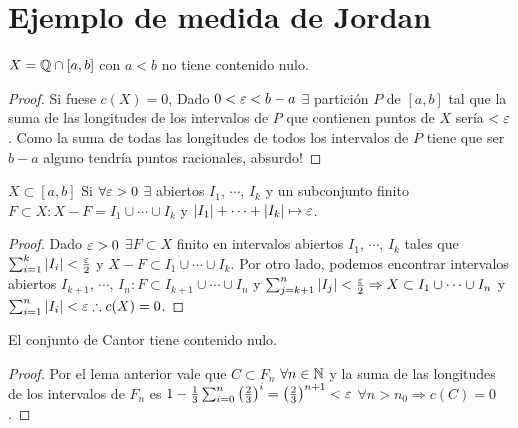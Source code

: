 \section{Ejemplo de medida de Jordan}

\begin{eg}
  \(X = \mathbb{Q} \cap [a, b]\) con \(a < b\) no tiene contenido nulo.
  \begin{proof}
    Si fuese \(c(X) = 0\), Dado \(0 < \varepsilon < b-a\) \(\exists \) partición \(P\) de \([a, b]\) tal que la suma de las longitudes de los intervalos de \(P\) que contienen puntos de \(X\) sería \(< \varepsilon \).
    Como la suma de todas las longitudes de todos los intervalos de \(P\) tiene que ser \(b-a\) alguno tendría puntos racionales, absurdo!
  \end{proof}
\end{eg}

\begin{lemma}
  \(X \subset [a, b]\) Si \(\forall \varepsilon > 0\) \(\exists \) abiertos \(I_1\), \(\cdots \), \(I_k\) y un subconjunto finito \(F \subset X : X - F = I_1 \cup \cdots \cup I_k\) y \(|I_1| + \cdots + |I_k| \mapsto \varepsilon \).
  \begin{proof}
    Dado \(\varepsilon > 0\) \(\exists F \subset X\) finito en intervalos abiertos \(I_1\), \(\cdots \), \(I_k\) tales que \(\sum_{i = 1}^k |I_i| < \frac{\varepsilon}{2} \) y \(X - F \subset I_1 \cup \cdots \cup I_k\). Por otro lado,
    podemos encontrar intervalos abiertos \(I_{k+1} \), \(\cdots \), \(I_n : F \subset I_{k+1} \cup \cdots \cup I_n\) y \(\sum_{j = k+1}^n |I_j| < \frac{\varepsilon}{2} \Rightarrow X \subset I_1 \cup \cdots \cup I_n\) y \(\sum_{i = 1}^n |I_i| < \varepsilon \therefore c(X) = 0\).
  \end{proof}
\end{lemma}

\begin{eg}
  El conjunto de Cantor tiene contenido nulo.
  \begin{proof}
    Por el lema anterior vale que \(C \subset F_n\) \(\forall n \in \mathbb{N} \) y la suma de las longitudes de los intervalos de \(F_n\) es \(1 - \frac{1}{3} \sum_{i = 0}^n \left(\frac{2}{3}\right)^i = \left(\frac{2}{3}\right)^{n+1} < \varepsilon \) \(\forall n > n_0 \Rightarrow c(C) = 0\).
  \end{proof}
\end{eg}

\clearpage

